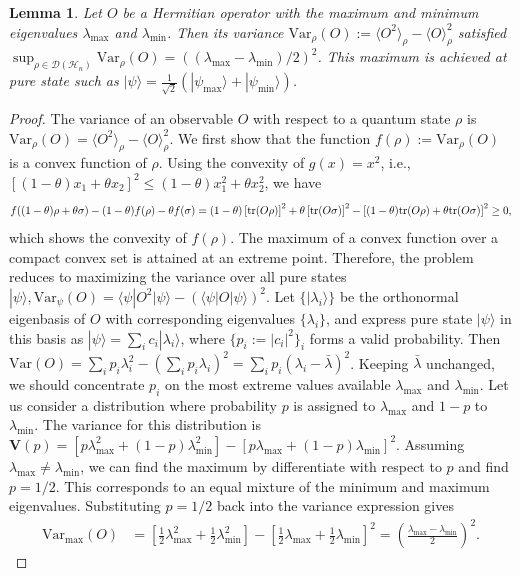 \documentclass[aps,%
twocolumn,%
floatfix,%
pra,%
amsfonts,%
groupedaddress,%
superscriptaddress]{revtex4-2}%
\newtheorem{lemma}{Lemma}
\newcommand{\1}{\mathbbm{1}}
\begin{document}
\begin{lemma}
    \label{lemma:max_variance}
    Let $O$ be a Hermitian operator with the maximum and minimum eigenvalues $\lambda_{\text{max}}$ and $\lambda_{\text{min}}$. Then its variance $\text{Var}_{\rho}(O) := \langle O^2 \rangle_{\rho} - \langle O \rangle_{\rho}^2$ satisfied $ \sup_{\rho \in \mathcal{D}(\mathcal{H}_n)}\text{Var}_{\rho}(O) = \left( {(\lambda_{\text{max}} - \lambda_{\text{min}})}/{2} \right)^2$.
     This maximum is achieved at pure state such as $|\psi\rangle = \frac{1}{\sqrt{2}}(|\psi_{\text{max}}\rangle + |\psi_{\text{min}}\rangle)$.
\end{lemma}
    \begin{proof}
    The variance of an observable $O$ with respect to a quantum state $\rho$ is $\text{Var}_\rho(O) = \langle O^2\rangle_\rho - \langle O\rangle_\rho^2$.
    We first show that the function $f(\rho):= \text{Var}_{\rho}(O)$ is a convex function of $\rho$. Using the convexity of $g(x) = x^2$, i.e., $[(1 - \theta)x_1 + \theta x_2]^2 \leq (1- \theta)x_1^2 + \theta x_2^2$, we have
    \begin{align}
        f((1- \theta)\rho + \theta \sigma) - (1- \theta)f(\rho) - \theta f(\sigma) = (1- \theta)\left[\text{tr}(O\rho)\right]^2 + \theta \left[\text{tr}(O\sigma)\right]^2 -\left[(1- \theta)\text{tr}(O\rho) + \theta \text{tr}(O\sigma)\right]^2 \geq 0, \notag
    \end{align}
    which shows the convexity of $f(\rho)$.
    The maximum of a convex function over a compact convex set is attained at an extreme point. Therefore, the problem reduces to maximizing the variance over all pure states $|\psi\rangle,  \text{Var}_{\psi}(O) = \langle\psi|O^2|\psi\rangle - (\langle\psi|O|\psi\rangle)^2 $.
    Let $\{|\lambda_i\rangle\}$ be the orthonormal eigenbasis of $O$ with corresponding eigenvalues $\{\lambda_i\}$, and express pure state $|\psi\rangle$ in this basis as $|\psi\rangle = \sum_i c_i |\lambda_i\rangle$, where $\{p_i:=|c_i|^2\}_i$ forms a valid probability. Then
    $ \text{Var}(O) = \sum_i p_i \lambda_i^2 - \left(\sum_i p_i \lambda_i\right)^2 = \sum_{i} p_i(\lambda_i - \bar{\lambda})^2 $.
    Keeping $\bar \lambda$ unchanged, we should concentrate $p_i$ on the most extreme values available $\lambda_{\text{max}}$ and $\lambda_{\text{min}}$. Let us consider a distribution where probability $p$ is assigned to $\lambda_{\text{max}}$ and $1-p$ to $\lambda_{\text{min}}$. The variance for this distribution is $ \mathbf{V}(p) = [p\lambda_{\text{max}}^2 + (1-p)\lambda_{\text{min}}^2] - [p\lambda_{\text{max}} + (1-p)\lambda_{\text{min}}]^2 $. 
    Assuming $\lambda_{\text{max}} \neq \lambda_{\text{min}}$, we can find the maximum by differentiate with respect to $p$ and find $p=1/2$. This corresponds to an equal mixture of the minimum and maximum eigenvalues.
    Substituting $p=1/2$ back into the variance expression gives 
    \begin{align}
    \text{Var}_{\text{max}}(O) &= \left[\frac{1}{2}\lambda_{\text{max}}^2 + \frac{1}{2}\lambda_{\text{min}}^2\right] - \left[\frac{1}{2}\lambda_{\text{max}} + \frac{1}{2}\lambda_{\text{min}}\right]^2 = \left( \frac{\lambda_{\text{max}} - \lambda_{\text{min}}}{2} \right)^2.
    \end{align}
    \end{proof}
\end{document}
